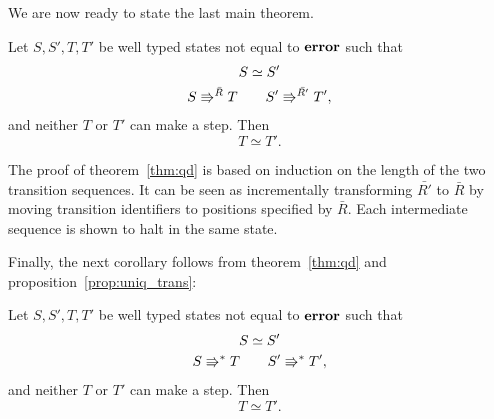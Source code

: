 We are now ready to state the last main theorem.

\begin{theorem} \label{thm:qd}
  Let $S, S', T, T'$ be well typed states not equal to $\mbox{{\bf error}}$ such that
  \begin{equation*}
    \begin{gathered}
      S \simeq S' \\
      S \Rrightarrow^{\bar{R}} T \quad\quad S' \Rrightarrow^{\bar{R'}} T',
    \end{gathered}
  \end{equation*}
  and neither $T$ or $T'$ can make a step.  Then
  \begin{equation*}
    T \simeq T'.
  \end{equation*}
\end{theorem}

The proof of theorem~\ref{thm:qd} is based on induction on the length of the two
transition sequences. It can be seen as incrementally transforming $\bar{R'}$ to
$\bar{R}$ by moving transition identifiers to positions specified by $\bar{R}$.
Each intermediate sequence is shown to halt in the same state.

Finally, the next corollary follows from theorem~\ref{thm:qd} and
proposition~\ref{prop:uniq_trans}:
\begin{corollary}
  Let $S, S', T, T'$ be well typed states not equal to $\mbox{{\bf error}}$ such that
  \begin{equation*}
    \begin{gathered}
      S \simeq S' \\
      S \Rrightarrow^* T \quad\quad S' \Rrightarrow^* T',
    \end{gathered}
  \end{equation*}
  and neither $T$ or $T'$ can make a step.  Then
  \begin{equation*}
    T \simeq T'.
  \end{equation*}
\end{corollary}

